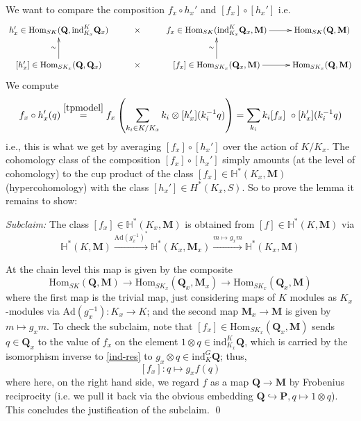\documentclass[10pt]{amsart}
\newcommand{\Ad}{\mathrm{Ad}}
\newcommand{\Hom}{\mathrm{Hom}}
\newcommand{\ind}{\mathrm{ind}}
\theoremstyle{remark}
\begin{document}
 
  We want to compare the composition  $f_x \circ h_x'$ and $[f_x] \circ [h_x']$
i.e.  
{\small \begin{equation}
 \xymatrix{
h_x'\in \Hom_{SK}(\mathbf{Q},  \ind_{K_x}^K \mathbf{Q}_x)    &  \times &  f_x \in \Hom_{SK}( \ind_{K_x}^K \mathbf{Q}_x, \mathbf{M})  \ar[r] & \Hom_{SK}(\mathbf{Q}, \mathbf{M}) \\ 
[h_x'] \in  \Hom_{SK_x}(\mathbf{Q}, \mathbf{Q}_x) \ar[u]^{\sim}  &  \times & [f_x] \in  \Hom_{SK_x}(\mathbf{Q}_x, \mathbf{M}) \ar[r]  \ar[u]^{\sim} & \Hom_{SK_x}(\mathbf{Q}, \mathbf{M})  
 }
\end{equation} }
We compute
 $$f_x \circ h_x'(q) \stackrel{\eqref{tpmodel}}{=} f_x\left( \sum_{k_i \in K/K_x} k_i\otimes   [h_x'](k_i^{-1} q)  \right) = \sum_{k_i} k_i [f_x] \ \circ   [h_x'](k_i^{-1} q) $$
i.e., this is what we get by averaging $ [f_x] \circ [h_x']$ over the action of $K/K_x$.
The  cohomology class of the composition $[f_x] \circ [h_x']$ simply amounts (at the level of cohomology)
 to the cup product of the class $[f_x] \in \mathbb{H}^*(K_x, \mathbf{M})$ (hypercohomology) with the class
 $[h_x'] \in H^*(K_x, S)$.   So to prove the lemma it remains to show:
 
 \medskip
 
 {\em Subclaim:} The class  $[f_x] \in \mathbb{H}^*(K_x, \mathbf{M})$
 is obtained from $[f] \in \mathbb{H}^*(K, \mathbf{M})$ 
via 
  $$ \mathbb{H}^*(K, \mathbf{M}) \stackrel{\Ad(g_x^{-1})^*}{\longrightarrow} \mathbb{H}^*(K_x, \mathbf{M}_x) \stackrel{m \mapsto g_x m}\longrightarrow \mathbb{H}^*(K_x, \mathbf{M}) $$
  
  \medskip
  
  
%
%
%
%
%
  
  
 At the chain level this map is given by the composite
 $$ \Hom_{SK}(\mathbf{Q}, \mathbf{M}) 
 \rightarrow \Hom_{S K_x}(\mathbf{Q}_x, \mathbf{M}_x) \rightarrow  \Hom_{SK_x}(\mathbf{Q}_x, \mathbf{M})$$
 where the first map is the trivial map, just considering maps of $K$ modules
 as $K_x$-modules via $\Ad(g_x^{-1}):K_x \rightarrow K$; and the second map $\mathbf{M}_x \rightarrow \mathbf{M}$ is given by $m \mapsto g_x m$.  
%
%
%
%
To check the subclaim, note  that  $[ f_x] \in \Hom_{S K_x}(\mathbf{Q}_x, \mathbf{M})$ 
 sends $q \in \mathbf{Q}_x$ to the value
 of $f_x$ on the element
 $1 \otimes q  \in \ind^{K}_{K_x} \mathbf{Q} $, which is carried by the isomorphism  inverse to \eqref{ind-res}
 to $g_x \otimes q  \in \ind_{K}^G \mathbf{Q}$; thus,  
 $$[f_x]: q \mapsto g_x f(q)$$
 where here, on the right hand side, we regard $f$ as a map $\mathbf{Q} \rightarrow \mathbf{M}$ by Frobenius reciprocity (i.e. we pull it back via the obvious embedding $\mathbf{Q} \hookrightarrow \mathbf{P},q \mapsto 1 \otimes q$). 
 This concludes the justification of the subclaim.  \qed
 
\end{document}
